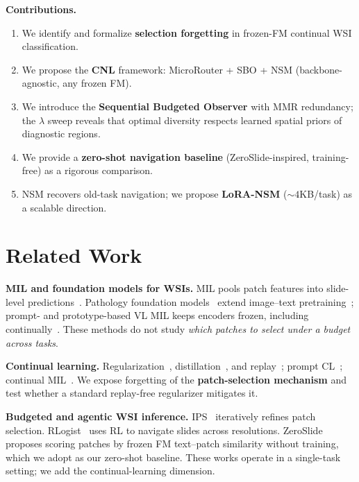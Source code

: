 \documentclass[runningheads]{llncs}
\begin{document}
\noindent\textbf{Contributions.}
\begin{enumerate}
\item We identify and formalize \textbf{selection forgetting} in
frozen-FM continual WSI classification.
\item We propose the \textbf{CNL} framework: MicroRouter + SBO + NSM
(backbone-agnostic, any frozen FM).
\item We introduce the \textbf{Sequential Budgeted Observer} with MMR
redundancy; the $\lambda$ sweep reveals that optimal diversity
respects learned spatial priors of diagnostic regions.
\item We provide a \textbf{zero-shot navigation baseline}
(ZeroSlide-inspired, training-free) as a rigorous comparison.
\item NSM recovers old-task navigation; we propose \textbf{LoRA-NSM}
(${\sim}4$KB/task) as a scalable direction.
\end{enumerate}

\section{Related Work}
\label{sec:related}

\noindent\textbf{MIL and foundation models for WSIs.}
MIL pools patch features into slide-level
predictions~\cite{ilse2018abmil,lu2021clam,shao2021transmil,li2021dsmil}.
Pathology foundation models~\cite{lu2024conch,chen2024uni,huang2023plip}
extend image--text pretraining~\cite{radford2021clip}; prompt- and
prototype-based VL MIL keeps encoders frozen, including
continually~\cite{gou2025qpmil}. These methods do not study
\emph{which patches to select under a budget across tasks}.

\noindent\textbf{Continual learning.}
Regularization~\cite{kirkpatrick2017ewc},
distillation~\cite{li2017lwf}, and
replay~\cite{rebuffi2017icarl,chaudhry2019agem,buzzega2020der}; prompt
CL~\cite{wang2022l2p,wang2022dualprompt,smith2023coda}; continual
MIL~\cite{li2025akdpmp}. We expose forgetting of the
\textbf{patch-selection mechanism} and test whether a standard
replay-free regularizer mitigates it.

\noindent\textbf{Budgeted and agentic WSI inference.}
IPS~\cite{bergner2023ips} iteratively refines patch selection.
RLogist~\cite{zhao2023rlogist} uses RL to navigate slides
across resolutions. ZeroSlide~\cite{zeroslide} proposes scoring
patches by frozen FM text--patch similarity without training, which
we adopt as our zero-shot baseline. These works operate in a
single-task setting; we add the continual-learning dimension.
\end{document}
